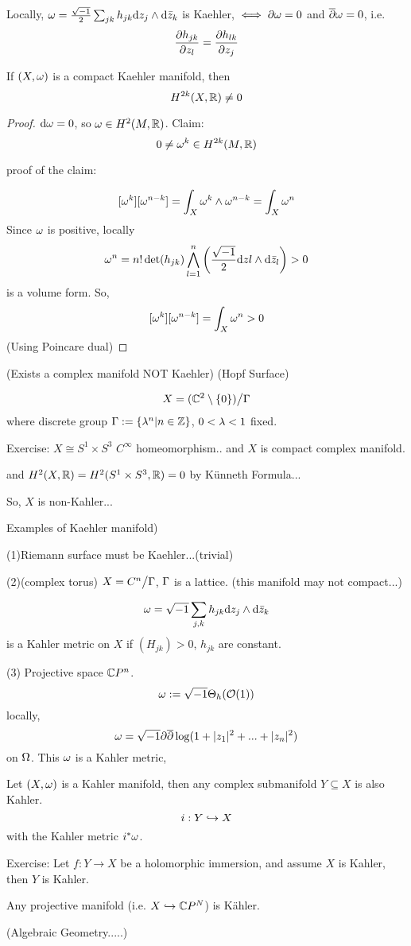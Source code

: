\begin{prop}
Locally, $\omega=\frac{\sqrt{-1}}{2}\sum_{jk} h_{jk}\mathrm{d} z_j\wedge\mathrm{d} \bar{z}_k$
is Kaehler, $\iff \partial\omega=0$ and $\overline{\partial}\omega=0$, i.e. 
$$\frac{\partial h_{jk}} {\partial z_l}=\frac{\partial h_{lk}} {\partial z_j}$$

If $(X,\omega)$ is a compact Kaehler manifold, then 
$$H^{2k}(X,\mathbb{R})\neq 0$$
\end{prop}

\begin{proof}
$\mathrm{d}\omega=0$, so $\omega\in H^2(M,\mathbb{R})$. Claim: 
$$0\neq \omega^k\in H^{2k}(M,\mathbb{R})$$

proof of the claim: 

$$[\omega^k][\omega^{n-k}]=\int_X\omega^k\wedge\omega^{n-k}=\int_X\omega^n$$
Since $\omega$ is positive,  locally 
$$\omega^n=n!\det(h_{jk})
\bigwedge_{l=1}^n\left(
\frac{\sqrt{-1}}{2}\mathrm{d} zl\wedge\mathrm{d}\bar{z}_l
\right)>0
$$
is a volume form. So, 
$$[\omega^k][\omega^{n-k}]=\int_{X}\omega^n>0$$
(Using Poincare dual)
\end{proof}

\begin{example}(Exists a complex manifold NOT Kaehler)
(Hopf Surface)

$$X=(\mathbb{C}^2\setminus\{0\})\big/\Gamma$$
where discrete group $\Gamma:=\{\lambda^n|n\in \mathbb{Z}\}$, 
$0<\lambda<1$ fixed.
\end{example}

Exercise: $X\cong S^1\times S^3$ $C^\infty$ homeomorphism..
and $X$ is compact complex manifold.

and $H^2(X,\mathbb{R})=H^2(S^1\times S^3,\mathbb{R})=0$
by K\"{u}nneth Formula...

So, $X$ is non-Kahler...

\begin{example}Examples of Kaehler manifold)

(1)Riemann surface must be Kaehler...(trivial)

(2)(complex torus) $X=C^n\big/\Gamma$, $\Gamma$ is a lattice.
(this manifold may not compact...)

$$\omega=\sqrt{-1}\sum_{j,k}h_{jk}\mathrm{d} z_j\wedge\mathrm{d}\bar{z}_k$$
is a Kahler metric on $X$ if $(H_{jk})>0$, $h_{jk}$ are constant.

(3) Projective space $\mathbb{C} P^n$.
$$\omega:=\sqrt{-1}\Theta_h(\mathcal{O}(1))$$
locally, 
$$\omega=\sqrt{-1}\partial\overline{\partial}\log(1+|z_1|^2+...+|z_n|^2)$$
on $\Omega$. This $\omega$ is a Kahler metric,
\end{example}

\begin{example}
Let $(X,\omega)$ is a Kahler manifold, 
then  any complex submanifold $Y\subseteq X$ is also Kahler.
$$i:Y\hookrightarrow X$$
with the Kahler metric $i^*\omega$.
\end{example}
Exercise: Let $f:Y\to X$ be a holomorphic immersion, and assume $X$ is Kahler, 
then $Y$ is Kahler.
\begin{cor}
Any projective manifold (i.e. $X\hookrightarrow \mathbb{C} P^N$) is K\"{a}hler.
\end{cor}
(Algebraic Geometry.....)

